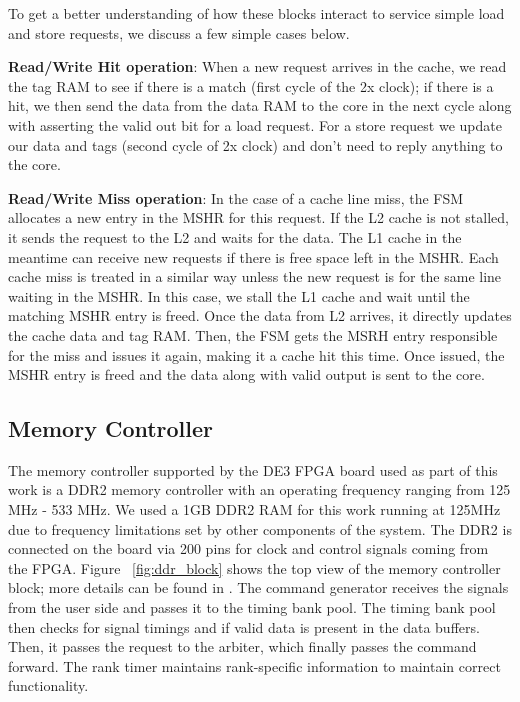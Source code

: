 To get a better understanding of how these blocks interact to service simple load and store requests, we discuss a few simple cases below.

\textbf{Read/Write Hit operation}: When a new request arrives in the cache, we read the tag RAM to see if there is a match (first cycle of the 2x clock); if there is a hit, we then send the data from the data RAM to the core in the next cycle along with asserting the valid out bit for a load request. For a store request we update our data and tags (second cycle of 2x clock) and don't need to reply anything to the core.

\textbf{Read/Write Miss operation}: In the case of a cache line miss, the FSM allocates a new entry in the MSHR for this request. If the L2 cache is not stalled, it sends the request to the L2 and waits for the data. The L1 cache in the meantime can receive new requests if there is free space left in the MSHR. Each cache miss is treated in a similar way unless the new request is for the same line waiting in the MSHR. In this case, we stall the L1 cache and wait until the matching MSHR entry is freed. Once the data from L2 arrives, it directly updates the cache data and tag RAM. Then, the FSM gets the MSRH entry responsible for the miss and issues it again, making it a cache hit this time. Once issued, the MSHR entry is freed and the data along with valid output is sent to the core.
\subsection{Memory Controller}
The memory controller supported by the DE3 FPGA board used as part of this work is a DDR2 memory controller with an operating frequency ranging from 125 MHz - 533 MHz. We used a 1GB DDR2 RAM for this work running at 125MHz due to frequency limitations set by other components of the system. The DDR2 is connected on the board via 200 pins for clock and control signals coming from the FPGA. Figure ~\ref{fig:ddr_block} shows the top view of the memory controller block; more details can be found in \cite{ddr2}. The command generator receives the signals from the user side and passes it to the timing bank pool. The timing bank pool then checks for signal timings and if valid data is present in the data buffers. Then, it passes the request to the arbiter, which finally passes the command forward. The rank timer maintains rank-specific information to maintain correct functionality.

